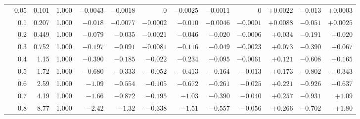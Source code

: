 \documentclass[11pt,a4paper]{article}
\begin{document}
\begin{table}[htbp]
\begin{tabular}{rrrrrrrrrrrrr}
 & 0.05 & 0.101 & 1.000 & $-0.0043$ & $-0.0018$ & $0$ & $-0.0025$ & $-0.0011$ & $0$ & $+0.0022$ & $-0.013$ & $+0.0003$ \\
 & 0.1 & 0.207 & 1.000 & $-0.018$ & $-0.0077$ & $-0.0002$ & $-0.010$ & $-0.0046$ & $-0.0001$ & $+0.0088$ & $-0.051$ & $+0.0025$ \\
 & 0.2 & 0.449 & 1.000 & $-0.079$ & $-0.035$ & $-0.0021$ & $-0.046$ & $-0.020$ & $-0.0006$ & $+0.034$ & $-0.191$ & $+0.020$ \\
 & 0.3 & 0.752 & 1.000 & $-0.197$ & $-0.091$ & $-0.0081$ & $-0.116$ & $-0.049$ & $-0.0023$ & $+0.073$ & $-0.390$ & $+0.067$ \\
 & 0.4 & 1.15 & 1.000 & $-0.390$ & $-0.185$ & $-0.022$ & $-0.234$ & $-0.095$ & $-0.0061$ & $+0.121$ & $-0.608$ & $+0.165$ \\
 & 0.5 & 1.72 & 1.000 & $-0.680$ & $-0.333$ & $-0.052$ & $-0.413$ & $-0.164$ & $-0.013$ & $+0.173$ & $-0.802$ & $+0.343$ \\
 & 0.6 & 2.59 & 1.000 & $-1.09$ & $-0.554$ & $-0.105$ & $-0.672$ & $-0.261$ & $-0.025$ & $+0.221$ & $-0.926$ & $+0.637$ \\
 & 0.7 & 4.19 & 1.000 & $-1.66$ & $-0.872$ & $-0.195$ & $-1.03$ & $-0.390$ & $-0.040$ & $+0.257$ & $-0.931$ & $+1.09$ \\
 & 0.8 & 8.77 & 1.000 & $-2.42$ & $-1.32$ & $-0.338$ & $-1.51$ & $-0.557$ & $-0.056$ & $+0.266$ & $-0.702$ & $+1.80$ \\
\bottomrule
\end{tabular}
\end{table}
\end{document}
